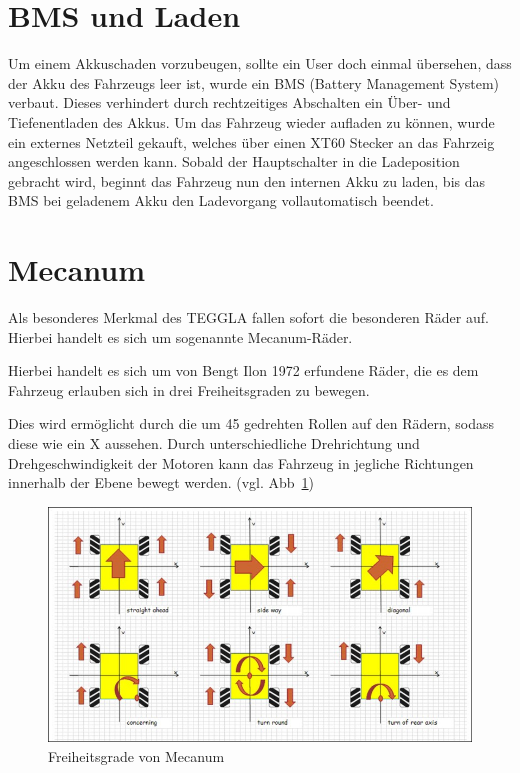 \section{BMS und Laden}
Um einem Akkuschaden vorzubeugen, sollte ein User doch einmal übersehen, dass der Akku des Fahrzeugs leer ist, wurde ein BMS (Battery Management System) verbaut.
Dieses verhindert durch rechtzeitiges Abschalten ein Über- und Tiefenentladen des Akkus. 
Um das Fahrzeug wieder aufladen zu können, wurde ein externes Netzteil gekauft, welches über einen XT60 Stecker an das Fahrzeig angeschlossen werden kann.
Sobald der Hauptschalter in die Ladeposition gebracht wird, beginnt das Fahrzeug nun den internen Akku zu laden, bis das BMS bei geladenem Akku den Ladevorgang vollautomatisch beendet.

\section{Mecanum}
Als besonderes Merkmal des TEGGLA fallen sofort die besonderen Räder auf. Hierbei handelt es sich um sogenannte Mecanum-Räder. 

Hierbei handelt es sich um von Bengt Ilon 1972 erfundene Räder, die es dem Fahrzeug erlauben sich in drei Freiheitsgraden zu bewegen.

Dies wird ermöglicht durch die um 45\degree{} gedrehten Rollen auf den Rädern, sodass diese wie ein X aussehen.
Durch unterschiedliche Drehrichtung und Drehgeschwindigkeit der Motoren kann das Fahrzeug in jegliche Richtungen innerhalb der Ebene bewegt werden. (vgl. Abb~\ref{bild:mecanum})

\begin{figure}[!ht]
	\centering
	\includegraphics[width=\textwidth]{bilder/mecanum.jpg}
	\caption{Freiheitsgrade von Mecanum \cite{link:mecanum}}
	\label{bild:mecanum}
\end{figure}


